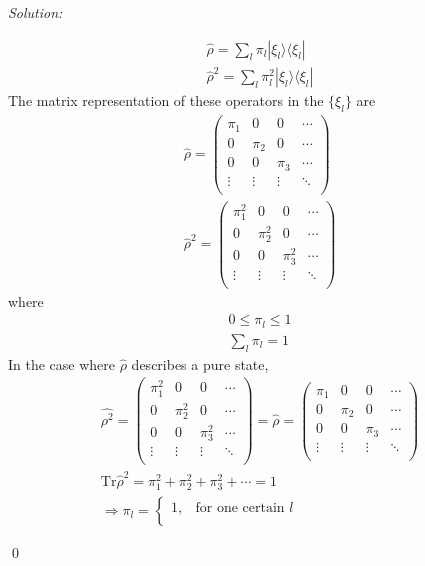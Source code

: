 \documentclass[12pt,a4paper]{article}
\newenvironment{sol}
    {\emph{Solution:}
    }
    {
    \qed
    }
\begin{document}
\begin{sol}
\begin{gather}
\hat{\rho}=\sum_l\pi_l|\xi_l\rangle\langle\xi_l|\\
\hat{\rho}^2=\sum_l\pi_l^2|\xi_l\rangle\langle\xi_l|
\end{gather}
The matrix representation of these operators in the $\{\xi_l\}$ are
\begin{gather}
\hat{\rho}=\left(\begin{array}{cccc}
\pi_1&0&0&\cdots\\
0&\pi_2&0&\cdots\\
0&0&\pi_3&\cdots\\
\vdots&\vdots&\vdots&\ddots\\
\end{array}\right)\\
\hat{\rho}^2=\left(\begin{array}{cccc}
\pi_1^2&0&0&\cdots\\
0&\pi_2^2&0&\cdots\\
0&0&\pi_3^2&\cdots\\
\vdots&\vdots&\vdots&\ddots\\
\end{array}\right)
\end{gather}
where
\begin{gather}
0\leq\pi_l\leq1\\
\sum_l\pi_l=1
\end{gather}
In the case where $\hat{\rho}$ describes a pure state,
\begin{gather}
\hat{\rho^2}=\left(\begin{array}{cccc}
\pi_1^2&0&0&\cdots\\
0&\pi_2^2&0&\cdots\\
0&0&\pi_3^2&\cdots\\
\vdots&\vdots&\vdots&\ddots\\
\end{array}\right)=\hat{\rho}=\left(\begin{array}{cccc}
\pi_1&0&0&\cdots\\
0&\pi_2&0&\cdots\\
0&0&\pi_3&\cdots\\
\vdots&\vdots&\vdots&\ddots\\
\end{array}\right)\\
\text{Tr}\hat{\rho}^2=\pi_1^2+\pi_2^2+\pi_3^2+\cdots=1\\
\Longrightarrow\pi_l=\left\{\begin{array}{ll}
1,&\text{for one certain }l\\

\end{array}
\end{gather}
\end{sol}
\end{document}
